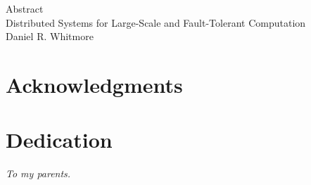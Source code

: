 \documentclass[12pt,oneside]{report}
\begin{document}


\begin{center}
Abstract\\[\baselineskip]
Distributed Systems for Large-Scale and Fault-Tolerant Computation\\[\baselineskip]
Daniel R. Whitmore
\end{center}

\clearpage

\tableofcontents
\listoffigures
\listoftables
\clearpage
\chapter*{Acknowledgments}

\clearpage
\chapter*{Dedication}
\begin{center}\itshape To my parents.\end{center}
\clearpage







\appendix




\end{document}
